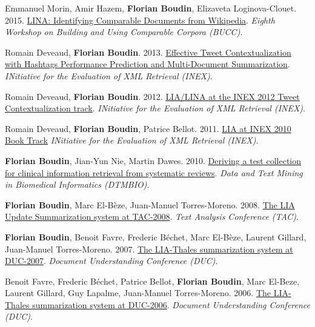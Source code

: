 \item 
Emmanuel Morin, Amir Hazem, \textbf{Florian Boudin}, Elizaveta Loginova-Clouet.
2015.
\href{https://aclanthology.org/W15-3413.pdf}{LINA: Identifying Comparable Documents from Wikipedia}.
\textit{Eighth Workshop on Building and Using Comparable Corpora (BUCC)}.
\label{morin-etal-2015-lina}

\item 
Romain Deveaud, \textbf{Florian Boudin}.
2013.
\href{http://www.clef-initiative.eu/documents/71612/f20ff540-8fc7-476a-9c51-db20f8413cc6}{Effective Tweet Contextualization with Hashtags Performance Prediction and Multi-Document Summarization}.
\textit{INitiative for the Evaluation of XML Retrieval (INEX)}.
\label{deveaud-boudin-2013-effective}

\item 
Romain Deveaud, \textbf{Florian Boudin}.
2012.
\href{https://hal.science/hal-00755496/document}{LIA/LINA at the INEX 2012 Tweet Contextualization track}.
\textit{INitiative for the Evaluation of XML Retrieval (INEX)}.
\label{deveaud-boudin-2012-lia}

\item 
Romain Deveaud, \textbf{Florian Boudin}, Patrice Bellot.
2011.
\href{https://link.springer.com/chapter/10.1007/978-3-642-23577-1_10}{LIA at INEX 2010 Book Track}
\textit{INitiative for the Evaluation of XML Retrieval (INEX)}.
\label{deveaud-etal-2011-lia}

\item 
\textbf{Florian Boudin}, Jian-Yun Nie, Martin Dawes.
2010.
\href{https://dl.acm.org/doi/10.1145/1871871.1871882}{Deriving a test collection for clinical information retrieval from systematic reviews}.
\textit{Data and Text Mining in Biomedical Informatics (DTMBIO)}.
\label{boudin-etal-2010-deriving}

\item 
\textbf{Florian Boudin}, Marc El-Bèze, Juan-Manuel Torres-Moreno.
2008.
\href{www.nist.gov/tac/publications/2008/participant.papers/LIA.proceedings.pdf}{The LIA Update Summarization system at TAC-2008}.
\textit{Text Analysis Conference (TAC)}.
\label{boudin-etal-2008-lia}

\item 
\textbf{Florian Boudin}, Benoit Favre, Frederic Béchet, Marc El-Bèze, Laurent Gillard, Juan-Manuel Torres-Moreno.
2007.
\href{http://www-nlpir.nist.gov/projects/duc/pubs/2007papers/uavignon.ps}{The LIA-Thales summarization system at DUC-2007}.
\textit{Document Understanding Conference (DUC)}.
\label{boudin-etal-2007-lia}

\item 
Benoit Favre, Frederic Béchet, Patrice Bellot, \textbf{Florian Boudin}, Marc El-Beze, Laurent Gillard, Guy Lapalme, Juan-Manuel Torres-Moreno.
2006.
\href{http://www-nlpir.nist.gov/projects/duc/pubs/2006papers/LIA-Thales_Duc06_final.pdf}{The LIA-Thales summarization system at DUC-2006}.
\textit{Document Understanding Conference (DUC)}.
\label{favre-etal-2006-lia}